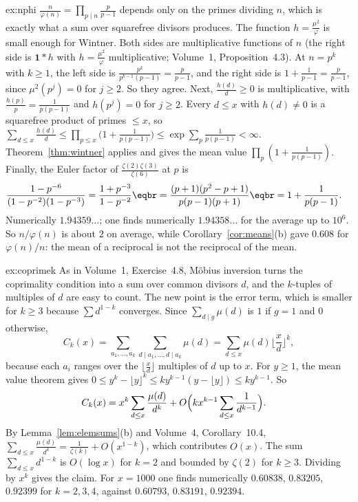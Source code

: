 \begin{solution}{ex:nphi}
\idea $\frac n{\varphi(n)}=\prod_{p\mid n}\frac p{p-1}$ depends only on the primes dividing $n$, which is exactly what a sum over squarefree divisors
produces. The function $h=\frac{\mu^2}\varphi$ is small enough for Wintner.
\writeup Both sides are multiplicative functions of $n$ (the right side is $\mathbf1*h$ with $h=\frac{\mu^2}\varphi$ multiplicative; Volume~1, Proposition~4.3). At
$n=p^k$ with $k\ge1$, the left side is $\frac{p^k}{p^{k-1}(p-1)}=\frac p{p-1}$, and the right side is $1+\frac1{p-1}=\frac p{p-1}$, since $\mu^2(p^j)=0$ for $j\ge2$.
So they agree. Next, $\frac{h(d)}d\ge0$ is multiplicative, with $\frac{h(p)}p=\frac1{p(p-1)}$ and $h(p^j)=0$ for $j\ge2$. Every $d\le x$ with $h(d)\ne0$
is a squarefree product of primes $\le x$, so $\sum_{d\le x}\frac{h(d)}d\le\prod_{p\le x}\bigl(1+\frac1{p(p-1)}\bigr)\le\exp\sum_p\frac1{p(p-1)}<\infty$. Theorem~\ref{thm:wintner}
applies and gives the mean value $\prod_p(1+\frac1{p(p-1)})$. Finally, the Euler factor of $\frac{\zeta(2)\zeta(3)}{\zeta(6)}$ at $p$ is
\[
\begin{aligned}\frac{1-p^{-6}}{(1-p^{-2})(1-p^{-3})}&=\frac{1+p^{-3}}{1-p^{-2}}\eqbr=\frac{(p+1)(p^2-p+1)}{p(p-1)(p+1)}\eqbr=1+\frac1{p(p-1)}.\end{aligned}
\]
Numerically $1.94359\ldots$; one finds numerically $1.94358\ldots$ for the average up to $10^6$. So $n/\varphi(n)$ is about $2$ on average, while
Corollary~\ref{cor:means}(b) gave $0.608$ for $\varphi(n)/n$: the mean of a reciprocal is not the reciprocal of the mean.
\end{solution}

\begin{solution}{ex:coprimek}
\idea As in Volume~1, Exercise~4.8, Möbius inversion turns the coprimality condition into a sum over common divisors $d$, and the $k$-tuples
of multiples of $d$ are easy to count. The new point is the error term, which is smaller for $k\ge3$ because $\sum d^{1-k}$ converges.
\writeup Since $\sum_{d\mid g}\mu(d)$ is $1$ if $g=1$ and $0$ otherwise,
\[
C_k(x)=\sum_{a_1,\dots,a_k}\sum_{d\mid a_1,\dots,d\mid a_k}\mu(d)=\sum_{d\le x}\mu(d)\lfloor\frac xd\rfloor^k,
\]
because
each $a_i$ ranges over the $\lfloor\frac xd\rfloor$ multiples of $d$ up to $x$. For $y\ge1$, the mean value theorem gives $0\le y^k-\lfloor y\rfloor^k\le ky^{k-1}(y-\lfloor y\rfloor)\le ky^{k-1}$.
So
\[
\begin{aligned}C_k(x)&=x^k\sum_{d\le x}\frac{\mu(d)}{d^k}+O\Bigl(kx^{k-1}\sum_{d\le x}\frac1{d^{k-1}}\Bigr).\end{aligned}
\]
By Lemma~\ref{lem:elemsums}(b) and Volume~4, Corollary~10.4, $\sum_{d\le x}\frac{\mu(d)}{d^k}=\frac1{\zeta(k)}+O(x^{1-k})$, which contributes $O(x)$. The sum
$\sum_{d\le x}d^{1-k}$ is $O(\log x)$ for $k=2$ and bounded by $\zeta(2)$ for $k\ge3$. Dividing by $x^k$ gives the claim. For $x=1000$ one finds numerically
$0.60838$, $0.83205$, $0.92399$ for $k=2,3,4$, against $0.60793$, $0.83191$, $0.92394$.
\end{solution}

